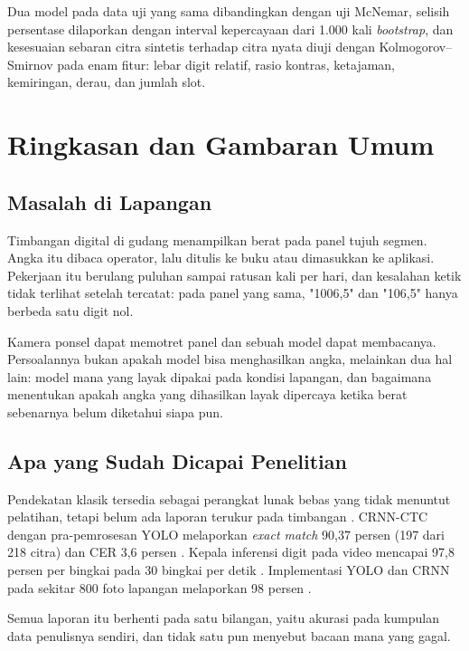 \documentclass[12pt,a4paper,oneside]{report}
\newcommand{\parencite}[1]{\citep{#1}}
\begin{document}
Dua model pada data uji yang sama dibandingkan dengan uji McNemar, selisih
persentase dilaporkan dengan interval kepercayaan dari 1.000 kali
\textit{bootstrap}, dan kesesuaian sebaran citra sintetis terhadap citra nyata
diuji dengan Kolmogorov--Smirnov pada enam fitur: lebar digit relatif, rasio
kontras, ketajaman, kemiringan, derau, dan jumlah slot.

\chapter{Ringkasan dan Gambaran Umum}

\section{Masalah di Lapangan}

Timbangan digital di gudang menampilkan berat pada panel tujuh segmen. Angka itu
dibaca operator, lalu ditulis ke buku atau dimasukkan ke aplikasi. Pekerjaan itu
berulang puluhan sampai ratusan kali per hari, dan kesalahan ketik tidak terlihat
setelah tercatat: pada panel yang sama, "1006,5" dan "106,5" hanya berbeda satu
digit nol.

Kamera ponsel dapat memotret panel dan sebuah model dapat membacanya. Persoalannya
bukan apakah model bisa menghasilkan angka, melainkan dua hal lain: model mana yang
layak dipakai pada kondisi lapangan, dan bagaimana menentukan apakah angka yang
dihasilkan layak dipercaya ketika berat sebenarnya belum diketahui siapa pun.

\section{Apa yang Sudah Dicapai Penelitian}

Pendekatan klasik tersedia sebagai perangkat lunak bebas yang tidak menuntut
pelatihan, tetapi belum ada laporan terukur pada timbangan
\parencite{auerswal_ssocr}. CRNN-CTC dengan pra-pemrosesan YOLO melaporkan \textit{exact match} 90,37 persen (197 dari 218 citra) dan CER 3,6
persen \parencite{effendi2025unjuk}. Kepala inferensi digit pada video mencapai
97,8 persen per bingkai pada 30 bingkai per detik
\parencite{yenneti2023lightweight}. Implementasi YOLO dan CRNN pada sekitar 800
foto lapangan melaporkan 98 persen \parencite{oicws2026lcd}.

Semua laporan itu berhenti pada satu bilangan, yaitu akurasi pada kumpulan data
penulisnya sendiri, dan tidak satu pun menyebut bacaan mana yang gagal.
\end{document}
